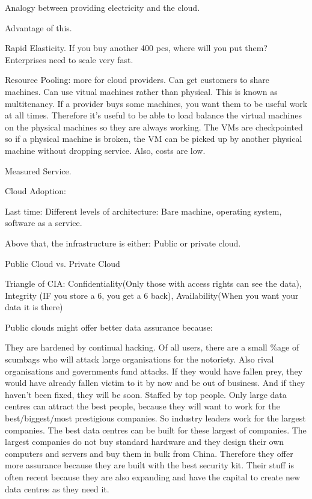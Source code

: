 \documentclass[11pt]{article}
\begin{document}
Analogy between providing electricity and the cloud.

Advantage of this.

Rapid Elasticity. If you buy another 400 pcs, where will you put them? Enterprises need to scale very fast.

Resource Pooling: more for cloud providers. Can get customers to share machines. Can use vitual machines rather than physical. This is known as multitenancy. If a provider buys some machines, you want them to be useful work at all times. Therefore it’s useful to be able to load balance the virtual machines on the physical machines so they are always working. The VMs are checkpointed so if a physical machine is broken, the VM can be picked up by another physical machine without dropping service. Also, costs are low.

Measured Service.

Cloud Adoption:

Last time: Different levels of architecture: Bare machine, operating system, software as a service.

Above that, the infrastructure is either: Public or private cloud.

Public Cloud vs. Private Cloud

Triangle of CIA: Confidentiality(Only those with access rights can see the data), Integrity (IF you store a 6, you get a 6 back), Availability(When you want your data it is there)

Public clouds might offer better data assurance because:

They are hardened by continual hacking. Of all users, there are a small \%age of scumbags who will attack large organisations for the notoriety. Also rival organisations and governments fund attacks. If they would have fallen prey, they would have already fallen victim to it by now and be out of business. And if they haven’t been fixed, they will be soon.
Staffed by top people. Only large data centres can attract the best people, because they will want to work for the best/biggest/most prestigious companies. So industry leaders work for the largest companies.
The best data centres can be built for these largest of companies. The largest companies do not buy standard hardware and they design their own computers and servers and buy them in bulk from China. Therefore they offer more assurance because they are built with the best security kit. Their stuff is often recent because they are also expanding and have the capital to create new data centres as they need it.
\end{document}
